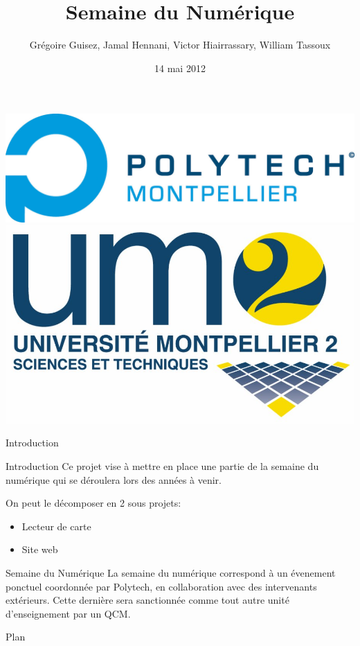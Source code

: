 \documentclass[handout]{beamer}
\title{Semaine du Numérique}
\author[G. Guisez, J. Hennani, V. Hiairrassary, W. Tassoux]{Grégoire Guisez, Jamal Hennani, Victor Hiairrassary, William Tassoux}
\institute{Polytech' Montpellier, Université Montpellier 2}
\date{14 mai 2012}
\begin{document}
\small 



\begin{frame}
    \titlepage

    \includegraphics[scale=0.2]{images/logoPolytech.jpg}
    \hfill
    \hskip8pt
    \includegraphics[scale=0.05]{images/logoUm2.jpg}
\end{frame}


\begin{frame}{Introduction}
    \begin{block}{Introduction}
 		 Ce projet vise à mettre en place une partie de la semaine du numérique qui se déroulera lors des années à venir.

		 On peut le décomposer en 2 sous projets:
		\begin{itemize}
			\item Lecteur de carte
			\item Site web
		\end{itemize}
	\end{block}

	\begin{block}{Semaine du Numérique}
	    La semaine du numérique correspond à un évenement ponctuel coordonnée 
    par Polytech, en collaboration avec des intervenants extérieurs. Cette 
    dernière sera sanctionnée comme tout autre unité d'enseignement par un QCM.
	\end{block}	
\end{frame}


\begin{frame}{Plan}
 	\tableofcontents
\end{frame}




\end{document}
